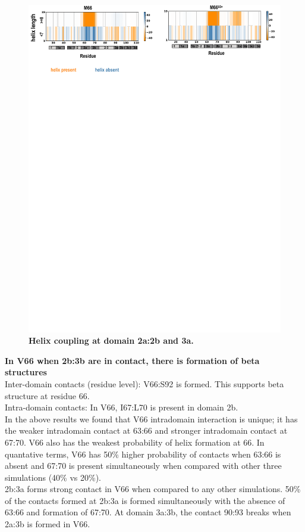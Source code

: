 \documentclass[journal=jacsat,manuscript=article]{achemso}
\begin{document}
\begin{figure}[!ht]
\includegraphics[scale=0.5,width=12cm,trim={0 0cm 0 0cm},clip]{../figures/n2.pdf}
\caption{{\bf  Helix coupling at domain 2a:2b and 3a.}
 }
\label{fig6}
\end{figure}

\textbf{In V66 when 2b:3b are in contact, there is formation of beta structures}\\
Inter-domain contacts (residue level): V66:S92 is formed. This supports beta structure at residue 66.\\
Intra-domain contacts: In V66, I67:L70 is present in domain 2b.\\
In the above results we found that V66 intradomain interaction is unique; it has the weaker intradomain contact at 63:66 and stronger intradomain contact at 67:70.  V66 also has the weakest probability of helix formation at 66. In quantative terms, V66 has 50\% higher probability of contacts when 63:66 is absent and 67:70 is present simultaneously when compared with other three simulations (40\% vs 20\%).\\
2b:3a forms strong contact in V66 when compared to any other simulations. 50\% of the contacts formed at 2b:3a is formed simultaneously with the absence of 63:66 and formation of 67:70. At domain 3a:3b, the contact 90:93 breaks when 2a:3b is formed in V66.\\
\end{document}
